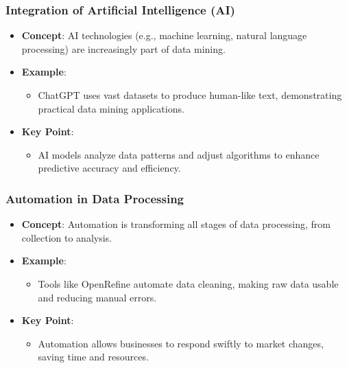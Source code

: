 \documentclass[aspectratio=169]{beamer}
\begin{document}
\begin{frame}[fragile]
    \frametitle{Integration of Artificial Intelligence (AI)}
    \begin{itemize}
        \item \textbf{Concept}: AI technologies (e.g., machine learning, natural language processing) are increasingly part of data mining.
        
        \item \textbf{Example}: 
        \begin{itemize}
            \item ChatGPT uses vast datasets to produce human-like text, demonstrating practical data mining applications.
        \end{itemize}
        
        \item \textbf{Key Point}: 
        \begin{itemize}
            \item AI models analyze data patterns and adjust algorithms to enhance predictive accuracy and efficiency.
        \end{itemize}
    \end{itemize}
\end{frame}

\begin{frame}[fragile]
    \frametitle{Automation in Data Processing}
    \begin{itemize}
        \item \textbf{Concept}: Automation is transforming all stages of data processing, from collection to analysis.
        
        \item \textbf{Example}: 
        \begin{itemize}
            \item Tools like OpenRefine automate data cleaning, making raw data usable and reducing manual errors.
        \end{itemize}
        
        \item \textbf{Key Point}: 
        \begin{itemize}
            \item Automation allows businesses to respond swiftly to market changes, saving time and resources.
        \end{itemize}
    \end{itemize}
\end{frame}
\end{document}
